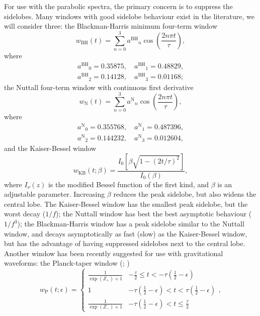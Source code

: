 \documentclass[useAMS,usedcolumn,usegraphicx,usenatbib]{mn2e}
\newcommand{\sub}[1]{\ensuremath{_\mathrm{#1}}}
\newcommand{\super}[1]{\ensuremath{^\mathrm{#1}}}
\newcommand{\recip}[1]{\ensuremath{\frac{1}{#1}}}
\begin{document}
For use with the parabolic spectra, the primary concern is to suppress the sidelobes. Many windows with good sidelobe behaviour exist in the literature, we will consider three: the Blackman-Harris minimum four-term window \citep{Harris1978, Nuttall1981}
\begin{equation}
w\sub{BH}(t) = \sum_{n=0}^{3} a\super{BH}_n\cos\left(\frac{2n\pi t}{\tau}\right),
\end{equation}
where
\begin{equation}
\begin{split}
a\super{BH}_0 = 0.35875, \quad a\super{BH}_1 = 0.48829,\\
a\super{BH}_2 = 0.14128, \quad a\super{BH}_3 = 0.01168;
\end{split}
\end{equation}
the Nuttall four-term window with continuous first derivative \citep{Nuttall1981}
\begin{equation}
w\sub{N}(t) = \sum_{n=0}^{3} a\super{N}_n\cos\left(\frac{2n\pi t}{\tau}\right),
\end{equation}
where
\begin{equation}
\begin{split}
a\super{N}_0 = 0.355768, \quad a\super{N}_1 = 0.487396,\\
a\super{N}_2 = 0.144232, \quad a\super{N}_3 = 0.012604,
\end{split}
\end{equation}
and the Kaiser-Bessel window \citep{Harris1978, Kaiser1980}
\begin{equation}
w\sub{KB}(t;\beta) = \frac{I_0\left[\beta\sqrt{1 - (2 t/\tau)^2}\right]}{I_0(\beta)},
\end{equation}
where $I_\nu(z)$ is the modified Bessel function of the first kind, and $\beta$ is an adjustable parameter. Increasing $\beta$ reduces the peak sidelobe, but also widens the central lobe. The Kaiser-Bessel window has the smallest peak sidelobe, but the worst decay ($1/f$); the Nuttall window has best the best asymptotic behaviour ($1/f^3$); the Blackman-Harris window has a peak sidelobe similar to the Nuttall window, and decays asymptotically as fast (slow) as the Kaiser-Bessel window, but has the advantage of having suppressed sidelobes next to the central lobe. Another window has been recently suggested for use with gravitational waveforms: the Planck-taper window (\citealt*{Damour2000}; \citealt{McKechan2010})
\begin{equation}
w\sub{P}(t; \epsilon) = \begin{cases}
 {\displaystyle \recip{\exp(Z_+)+1}} & {\displaystyle -\frac{\tau}{2} \leq t < -\tau\left(\recip{2} - \epsilon\right)} \\
 1 & {\displaystyle -\tau\left(\recip{2} - \epsilon\right) < t < \tau\left(\recip{2} - \epsilon\right)} \\
 {\displaystyle \recip{\exp(Z_-)+1}} & {\displaystyle -\tau\left(\recip{2} - \epsilon\right) < t \leq \frac{\tau}{2}}
\end{cases},
\end{equation}
\end{document}
